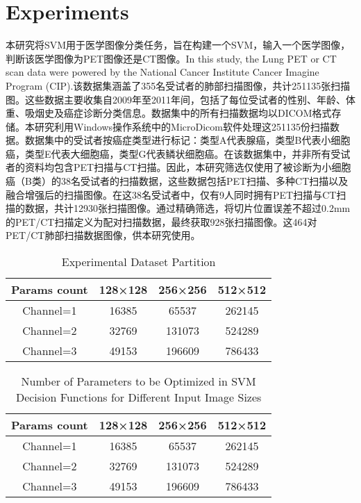 \documentclass[twocolumn]{article}
\begin{document}
\section{Experiments}
本研究将SVM用于医学图像分类任务，旨在构建一个SVM，输入一个医学图像，判断该医学图像为PET图像还是CT图像。In this study, the Lung PET or CT scan data\cite{li_large-scale_2020} were powered by the National Cancer Institute Cancer Imagine Program (CIP).该数据集涵盖了355名受试者的肺部扫描图像，共计251135张扫描图。这些数据主要收集自2009年至2011年间，包括了每位受试者的性别、年龄、体重、吸烟史及癌症诊断分类信息。数据集中的所有扫描数据均以DICOM格式存储。本研究利用Windows操作系统中的MicroDicom软件处理这251135份扫描数据。数据集中的受试者按癌症类型进行标记：类型A代表腺癌，类型B代表小细胞癌，类型E代表大细胞癌，类型G代表鳞状细胞癌。在该数据集中，并非所有受试者的资料均包含PET扫描与CT扫描。因此，本研究筛选仅使用了被诊断为小细胞癌（B类）的38名受试者的扫描数据，这些数据包括PET扫描、多种CT扫描以及融合增强后的扫描图像。在这38名受试者中，仅有9人同时拥有PET扫描与CT扫描的数据，共计12930张扫描图像。通过精确筛选，将切片位置误差不超过0.2mm的PET/CT扫描定义为配对扫描数据，最终获取928张扫描图像。这464对PET/CT肺部扫描数据图像，供本研究使用。

\begin{table}[h]
	\centering
	\caption{Experimental Dataset Partition}
	\label{tab:dataset_partition}
	\begin{tabular}{cccc}
		\toprule
		Params count & 128×128 & 256×256 & 512×512 \\
		\midrule
		Channel=1    & 16385   & 65537   & 262145  \\
		Channel=2    & 32769   & 131073  & 524289  \\
		Channel=3    & 49153   & 196609  & 786433  \\
		\bottomrule
	\end{tabular}
\end{table}

\begin{table}[h]
	\centering
	\caption{Number of Parameters to be Optimized in SVM Decision Functions for Different Input Image Sizes}
	\label{tab:params_count}
	\begin{tabular}{cccc}
		\toprule
		Params count & 128×128 & 256×256 & 512×512 \\
		\midrule
		Channel=1    & 16385   & 65537   & 262145  \\
		Channel=2    & 32769   & 131073  & 524289  \\
		Channel=3    & 49153   & 196609  & 786433  \\
		\bottomrule
	\end{tabular}
\end{table}
\end{document}
